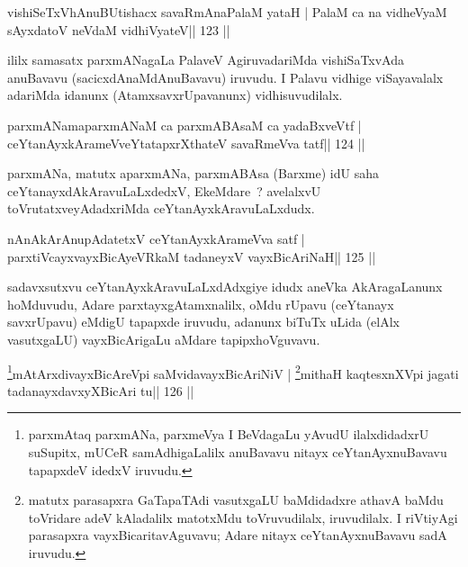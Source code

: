 \begin{shl}
vishiSeTxVhAnuBUtishacx savaRmAnaPalaM yataH |
PalaM ca na vidheVyaM sAyxdatoV neVdaM vidhiVyateV\hfill || 123 ||
\end{shl}

\begin{artha}
ililx samasatx parxmANagaLa PalaveV AgiruvadariMda vishiSaTxvAda anuBavavu (sacicxdAnaMdAnuBavavu) iruvudu. I Palavu vidhige viSayavalalx adariMda idanunx (AtamxsavxrUpavanunx) vidhisuvudilalx.
\end{artha}


\begin{shl}
parxmANamaparxmANaM ca parxmABAsaM ca yadaBxveVtf |
ceYtanAyxkArameVveYtatapxrXthateV savaRmeVva tatf\hfill || 124 ||
\end{shl}

\begin{artha}
parxmANa, matutx aparxmANa, parxmABAsa (Barxme) idU saha ceYtanayxdAkAravuLaLxdedxV, EkeMdare~? avelalxvU toVrutatxveyAdadxriMda ceYtanAyxkAravuLaLxdudx.
\end{artha}


\begin{shl}
nAnAkArAnupAdatetxV ceYtanAyxkArameVva satf |
parxtiVcayxvayxBicAyeVRkaM tadaneyxV vayxBicAriNaH\hfill || 125 ||
\end{shl}

\begin{artha}
sadavxsutxvu ceYtanAyxkAravuLaLxdAdxgiye idudx aneVka AkAragaLanunx hoMduvudu, Adare parxtayxgAtamxnalilx, oMdu rUpavu (ceYtanayx savxrUpavu) eMdigU tapapxde iruvudu, adanunx biTuTx uLida (elAlx vasutxgaLU) vayxBicArigaLu aMdare tapipxhoVguvavu.
\end{artha}

\begin{shl}
\footnote{parxmAtaq parxmANa, parxmeVya I BeVdagaLu yAvudU ilalxdidadxrU suSupitx, mUCeR samAdhigaLalilx anuBavavu nitayx ceYtanAyxnuBavavu tapapxdeV idedxV iruvudu.}mAtArxdivayxBicAreV\s pi saMvidavayxBicAriNiV |
\footnote{matutx parasapxra GaTapaTAdi vasutxgaLU baMdidadxre athavA baMdu toVridare adeV kAladalilx matotxMdu toVruvudilalx, iruvudilalx. I riVtiyAgi parasapxra vayxBicaritavAguvavu; Adare nitayx ceYtanAyxnuBavavu sadA iruvudu.}mithaH kaqtesxnXV\s pi jagati tadanayxdavxyXBicAri tu\hfill || 126 ||
\end{shl}

